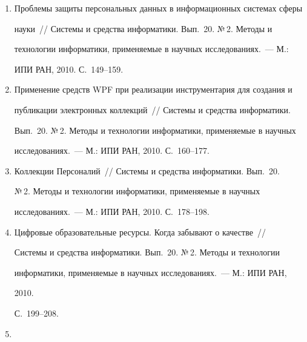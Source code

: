 \begin{enumerate}[1.]
Особенности настройки объектно-ориен\-ти\-ро\-ван\-но\-го лингвистического 


процессора на тексты предметной об\-ласти~/\!\!/ Сис\-те\-мы и средства 


информатики. Вып.~20. №\,2. Методы и технологии информатики, 


применяемые в научных исследованиях.~--- М.: ИПИ РАН, 2010. 


С.~124--148.


\item {}


Проблемы защиты персональных данных в информационных системах сферы 


науки~/\!\!/ Сис\-те\-мы и средства информатики. Вып.~20. №\,2. Методы и 


технологии информатики, применяемые в научных исследованиях.~--- М.: 


ИПИ РАН, 2010. С.~149--159.


\item {}


Применение средств WPF при реализации инструментария для создания и 


публикации электронных коллекций~/\!\!/ Сис\-те\-мы и средства информатики. 


Вып.~20. №\,2. Методы и технологии информатики, применяемые в научных 


исследованиях.~--- М.: ИПИ РАН, 2010. С.~160--177.


\item {}


Коллекции Персоналий~/\!\!/ Сис\-те\-мы и средства информатики. Вып.~20. 


№\,2. Методы и технологии информатики, применяемые в научных 


исследованиях.~--- М.: ИПИ РАН, 2010. С.~178--198.


\item {}


Цифровые образовательные ресурсы. Когда забывают о качестве~/\!\!/ 


Сис\-те\-мы и средства информатики. Вып.~20. №\,2. Методы и технологии 


информатики, применяемые в научных исследованиях.~--- М.: ИПИ РАН, 


2010. 


С.~199--208.


\item {}



\end{enumerate}
